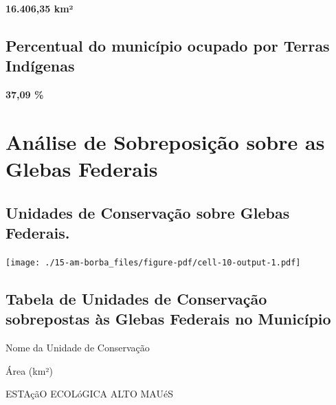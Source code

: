 \documentclass[
  letterpaper,
]{report}
\begin{document}
\textbf{16.406,35 km²}

\hypertarget{percentual-do-municuxedpio-ocupado-por-terras-induxedgenas-1}{%
\subsection{Percentual do município ocupado por Terras
Indígenas}\label{percentual-do-municuxedpio-ocupado-por-terras-induxedgenas-1}}

\textbf{37,09 \%}

\hypertarget{anuxe1lise-de-sobreposiuxe7uxe3o-sobre-as-glebas-federais-1}{%
\section{Análise de Sobreposição sobre as Glebas
Federais}\label{anuxe1lise-de-sobreposiuxe7uxe3o-sobre-as-glebas-federais-1}}

\hypertarget{unidades-de-conservauxe7uxe3o-sobre-glebas-federais.-1}{%
\subsection{Unidades de Conservação sobre Glebas
Federais.}\label{unidades-de-conservauxe7uxe3o-sobre-glebas-federais.-1}}

\texttt{[image: ./15-am-borba\_files/figure-pdf/cell-10-output-1.pdf]}

\hypertarget{tabela-de-unidades-de-conservauxe7uxe3o-sobrepostas-uxe0s-glebas-federais-no-municuxedpio-1}{%
\subsection{Tabela de Unidades de Conservação sobrepostas às Glebas
Federais no
Município}\label{tabela-de-unidades-de-conservauxe7uxe3o-sobrepostas-uxe0s-glebas-federais-no-municuxedpio-1}}

\n  

\n    

\n      

Nome da Unidade de Conservação

\n      

Área (km²)

\n    

\n  

\n  

\n    

\n      

ESTAçãO ECOLóGICA ALTO MAUéS

\n      
\end{document}
